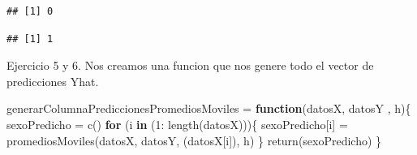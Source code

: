\documentclass[
]{article}
\newenvironment{Shaded}{\begin{snugshade}}{\end{snugshade}}
\newcommand{\ControlFlowTok}[1]{\textcolor[rgb]{0.13,0.29,0.53}{\textbf{#1}}}
\newcommand{\DecValTok}[1]{\textcolor[rgb]{0.00,0.00,0.81}{#1}}
\newcommand{\FloatTok}[1]{\textcolor[rgb]{0.00,0.00,0.81}{#1}}
\newcommand{\FunctionTok}[1]{\textcolor[rgb]{0.00,0.00,0.00}{#1}}
\newcommand{\NormalTok}[1]{#1}
\newcommand{\OtherTok}[1]{\textcolor[rgb]{0.56,0.35,0.01}{#1}}
\newcommand{\SpecialCharTok}[1]{\textcolor[rgb]{0.00,0.00,0.00}{#1}}
\begin{document}
\begin{Shaded}
\end{Shaded}

\begin{verbatim}
## [1] 0
\end{verbatim}

\begin{Shaded}
\end{Shaded}

\begin{verbatim}
## [1] 1
\end{verbatim}

Ejercicio 5 y 6. Nos creamos una funcion que nos genere todo el vector
de predicciones Yhat.

\begin{Shaded}
\begin{Highlighting}[]
\NormalTok{generarColumnaPrediccionesPromediosMoviles }\OtherTok{=} \ControlFlowTok{function}\NormalTok{(datosX, datosY , h)\{}
\NormalTok{  sexoPredicho }\OtherTok{=} \FunctionTok{c}\NormalTok{()}
  \ControlFlowTok{for}\NormalTok{ (i }\ControlFlowTok{in}\NormalTok{ (}\DecValTok{1}\SpecialCharTok{:} \FunctionTok{length}\NormalTok{(datosX)))\{}
\NormalTok{    sexoPredicho[i] }\OtherTok{=} \FunctionTok{promediosMoviles}\NormalTok{(datosX, datosY, (datosX[i]), h)}
\NormalTok{  \}}
  \FunctionTok{return}\NormalTok{(sexoPredicho)}
\NormalTok{\}}
\end{Highlighting}
\end{Shaded}

\begin{Shaded}
\end{Shaded}
\end{document}
